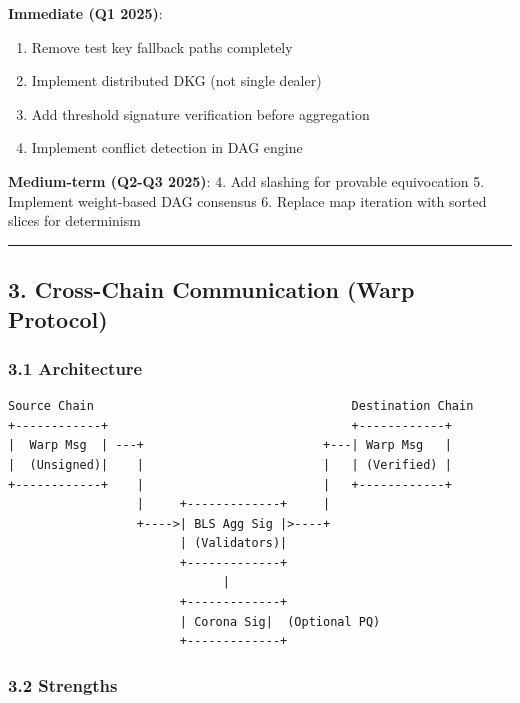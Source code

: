 \documentclass[
]{article}
\providecommand{\tightlist}{%
  \setlength{\itemsep}{0pt}\setlength{\parskip}{0pt}}
\begin{document}
\textbf{Immediate (Q1 2025)}:

\begin{enumerate}
\def\labelenumi{\arabic{enumi}.}
\tightlist
\item
  Remove test key fallback paths completely
\item
  Implement distributed DKG (not single dealer)
\item
  Add threshold signature verification before aggregation
\item
  Implement conflict detection in DAG engine
\end{enumerate}

\textbf{Medium-term (Q2-Q3 2025)}: 4. Add slashing for provable
equivocation 5. Implement weight-based DAG consensus 6. Replace map
iteration with sorted slices for determinism

\begin{center}\rule{0.5\linewidth}{0.5pt}\end{center}

\subsection{3. Cross-Chain Communication (Warp
Protocol)}\label{3-cross-chain-communication-warp-protocol}

\subsubsection{3.1 Architecture}\label{31-architecture}

\begin{verbatim}
Source Chain                                    Destination Chain
+------------+                                  +------------+
|  Warp Msg  | ---+                         +---| Warp Msg   |
|  (Unsigned)|    |                         |   | (Verified) |
+------------+    |                         |   +------------+
                  |     +-------------+     |
                  +---->| BLS Agg Sig |>----+
                        | (Validators)|
                        +-------------+
                              |
                        +-------------+
                        | Corona Sig|  (Optional PQ)
                        +-------------+
\end{verbatim}

\subsubsection{3.2 Strengths}\label{32-strengths}
\end{document}
